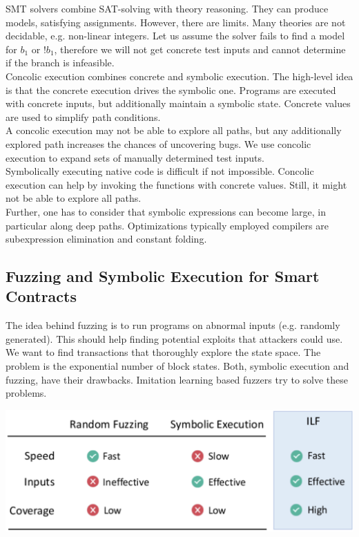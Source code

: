 SMT solvers combine SAT-solving with theory reasoning. They can produce models, satisfying assignments. However, there are limits. Many theories are not decidable, e.g. non-linear integers. Let us assume the solver fails to find a model for $b_1$ or $!b_1$, therefore we will not get concrete test inputs and cannot determine if the branch is infeasible. \\

Concolic execution combines concrete and symbolic execution. The high-level idea is that the concrete execution drives the symbolic one. Programs are executed with concrete inputs, but additionally maintain a symbolic state. Concrete values are used to simplify path conditions. \\

A concolic execution may not be able to explore all paths, but any additionally explored path increases the chances of uncovering bugs. We use concolic execution to expand sets of manually determined test inputs. \\

Symbolically executing native code is difficult if not impossible. Concolic execution can help by invoking the functions with concrete values. Still, it might not be able to explore all paths. \\

Further, one has to consider that symbolic expressions can become large, in particular along deep paths. Optimizations typically employed compilers are subexpression elimination and constant folding.


\subsection{Fuzzing and Symbolic Execution for Smart Contracts}

The idea behind fuzzing is to run programs on abnormal inputs (e.g. randomly generated). This should help finding potential exploits that attackers could use. \\

We want to find transactions that thoroughly explore the state space. The problem is the exponential number of block states. Both, symbolic execution and fuzzing, have their drawbacks. Imitation learning based fuzzers try to solve these problems.
\begin{center}
	\includegraphics[width=0.9\columnwidth]{assets/fuzzing}
\end{center}

